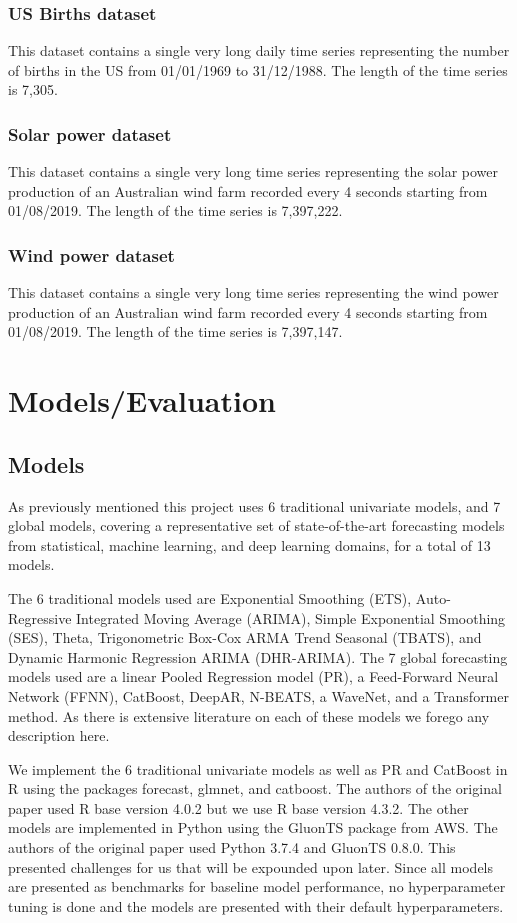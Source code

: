 \documentclass{article}
\begin{document}
\subsubsection{US Births dataset}
This dataset contains a single very long daily time series representing the number of births in the US
from 01/01/1969 to 31/12/1988. The length of the time series is 7,305.

\subsubsection{Solar power dataset}
This dataset contains a single very long time series representing the solar power production of an
Australian wind farm recorded every 4 seconds starting from 01/08/2019. The length of the time
series is 7,397,222.

\subsubsection{Wind power dataset}
This dataset contains a single very long time series representing the wind power production of an
Australian wind farm recorded every 4 seconds starting from 01/08/2019. The length of the time
series is 7,397,147.

\section{Models/Evaluation}

\subsection{Models}
As previously mentioned this project uses 6 traditional univariate models, and 7 global models, covering a representative set of state-of-the-art forecasting models from statistical, machine learning, and deep learning domains, for a total of 13 models.

The 6 traditional models used are Exponential Smoothing (ETS), Auto-Regressive Integrated Moving Average (ARIMA), Simple Exponential Smoothing
(SES), Theta, Trigonometric Box-Cox ARMA Trend Seasonal (TBATS), and Dynamic Harmonic Regression ARIMA (DHR-ARIMA). The 7 global forecasting models used are a linear Pooled Regression model (PR), a Feed-Forward Neural Network (FFNN), CatBoost, DeepAR, N-BEATS, a WaveNet, and a Transformer method. As there is extensive literature on each of these models we forego any description here. 

We implement the 6 traditional univariate models as well as PR and CatBoost in R using the packages forecast, glmnet, and catboost. The authors of the original paper used R base version 4.0.2 but we use R base version 4.3.2. The other models are implemented in Python using the GluonTS package from AWS. The authors of the original paper used Python 3.7.4 and GluonTS 0.8.0. This presented challenges for us that will be expounded upon later. Since all models are presented as benchmarks for baseline model performance, no hyperparameter tuning is done and the models are presented with their default hyperparameters. 
\end{document}
